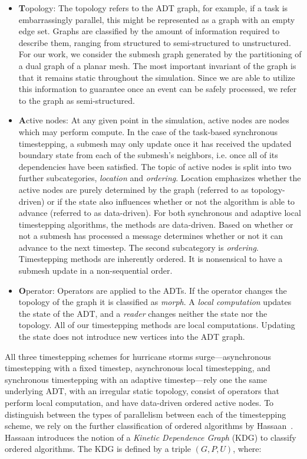 \begin{itemize}
\item {\bf T}opology: The topology refers to the ADT graph, for example, if a task is embarrassingly parallel, this might be represented as a graph with an empty edge set. Graphs are classified by the amount of information required to describe them, ranging from structured to semi-structured to unstructured. For our work, we consider the submesh graph generated by the partitioning of a dual graph of a planar mesh. The most important invariant of the graph is that it remains static throughout the simulation. Since we are able to utilize this information to guarantee once an event can be safely processed, we refer to the graph as semi-structured.
\item {\bf A}ctive nodes: At any given point in the simulation, active nodes are nodes which may perform  compute. In the case of the task-based synchronous timestepping, a submesh may only update once it has received the updated boundary state from each of the submesh's neighbors, i.e. once all of its dependencies have been satisfied. The topic of active nodes is split into two further subcategories, {\em location} and {\em ordering}. Location emphasizes whether the active nodes are purely determined by the graph (referred to as topology-driven) or if the state also influences whether or not the algorithm is able to advance (referred to as data-driven). For both synchronous and adaptive local timestepping algorithms, the methods are data-driven. Based on whether or not a submesh has processed a message determines whether or not it can advance to the next timestep. The second subcategory is {\em ordering}. Timestepping methods are inherently ordered. It is nonsensical to have a submesh update in a non-sequential order.
\item {\bf O}perator: Operators are applied to the ADTs. If the operator changes the topology of the graph it is classified as {\em morph}. A {\em local computation} updates the state of the ADT, and a {\em reader} changes neither the state nor the topology. All of our timestepping methods are local computations. Updating the state does not introduce new vertices into the ADT graph.
\end{itemize}
All three timestepping schemes for hurricane storms surge---asynchronous timestepping with a fixed timestep, asynchronous local timestepping, and synchronous timestepping with an adaptive timestep---rely one the same underlying ADT, with an irregular static topology, consist of operators that perform local computation, and have data-driven ordered active nodes. To distinguish between the types of parallelism between each of the timestepping scheme, we rely on the further classification of ordered algorithms by Hassaan~\cite{Hassaan2015, Hassaan2016}. Hassaan introduces the notion of a {\em Kinetic Dependence Graph} (KDG) to classify ordered algorithms. The KDG is defined by a triple $(G,P,U)$, where:

